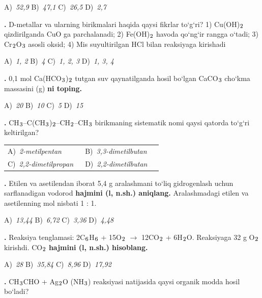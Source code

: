 \documentclass[11pt,a4paper]{article}
\renewcommand{\textsubscript}[1]{\ensuremath{_{\text{\fontsize{8}{8}\selectfont #1}}}}
\newcommand{\qn}[1]{\textbf{\fontsize{11.5}{13}\selectfont #1}}
\newcommand{\qsep}{\par\vspace{1pt}\noindent\rule{0pt}{0.4pt}\par\vspace{5pt}}
\begin{document}
\begin{multicols}{2}
\noindent A)~\textsl{52,9} \hfill B)~\textsl{47,1} \hfill C)~\textsl{26,5} \hfill D)~\textsl{2,7}\par
\qsep
\noindent\qn{18.} D-metallar va ularning birikmalari haqida qaysi fikrlar to`g`ri? 1) Cu(OH)\textsubscript{2} qizdirilganda CuO ga parchalanadi; 2) Fe(OH)\textsubscript{2} havoda qo`ng`ir rangga o`tadi; 3) Cr\textsubscript{2}O\textsubscript{3} asosli oksid; 4) Mis suyultirilgan HCl bilan reaksiyaga kirishadi

\noindent A)~\textsl{1, 2} \hfill B)~\textsl{4} \hfill C)~\textsl{1, 2, 3} \hfill D)~\textsl{1, 3, 4}\par
\qsep
\noindent\qn{19.} 0,1 mol Ca(HCO\textsubscript{3})\textsubscript{2} tutgan suv qaynatilganda hosil bo`lgan CaCO\textsubscript{3} cho`kma massasini (g)  \textbf{ni toping.}

\noindent A)~\textsl{20} \hfill B)~\textsl{10} \hfill C)~\textsl{5} \hfill D)~\textsl{15}\par
\qsep
\noindent\qn{20.} CH\textsubscript{3}--C(CH\textsubscript{3})\textsubscript{2}--CH\textsubscript{2}--CH\textsubscript{3} birikmaning sistematik nomi qaysi qatorda to`g`ri keltirilgan?

\noindent\begin{tabular}{@{}p{0.47\linewidth}@{}p{0.47\linewidth}@{}}
A)~\textsl{2-metilpentan} & B)~\textsl{3,3-dimetilbutan} \\
C)~\textsl{2,2-dimetilpropan} & D)~\textsl{2,2-dimetilbutan} \\
\end{tabular}\par
\qsep
\noindent\qn{21.} Etilen va asetilendan iborat 5,4 g aralashmani to`liq gidrogenlash uchun sarflanadigan vodorod \textbf{hajmini (l, n.sh.) aniqlang.} Aralashmadagi etilen va asetilenning mol nisbati 1 : 1.

\noindent A)~\textsl{13,44} \hfill B)~\textsl{6,72} \hfill C)~\textsl{3,36} \hfill D)~\textsl{4,48}\par
\qsep
\noindent\qn{22.} Reaksiya tenglamasi: 2C\textsubscript{6}H\textsubscript{6} + 15O\textsubscript{2} $\to$ 12CO\textsubscript{2} + 6H\textsubscript{2}O. Reaksiyaga 32 g O\textsubscript{2} kirishdi. CO\textsubscript{2} \textbf{hajmini (l, n.sh.) hisoblang.}

\noindent A)~\textsl{28} \hfill B)~\textsl{35,84} \hfill C)~\textsl{8,96} \hfill D)~\textsl{17,92}\par
\qsep
\noindent\qn{23.} CH\textsubscript{3}CHO + Ag\textsubscript{2}O (NH\textsubscript{3}) reaksiyasi natijasida qaysi organik modda hosil bo`ladi?


\end{multicols}
\end{document}
